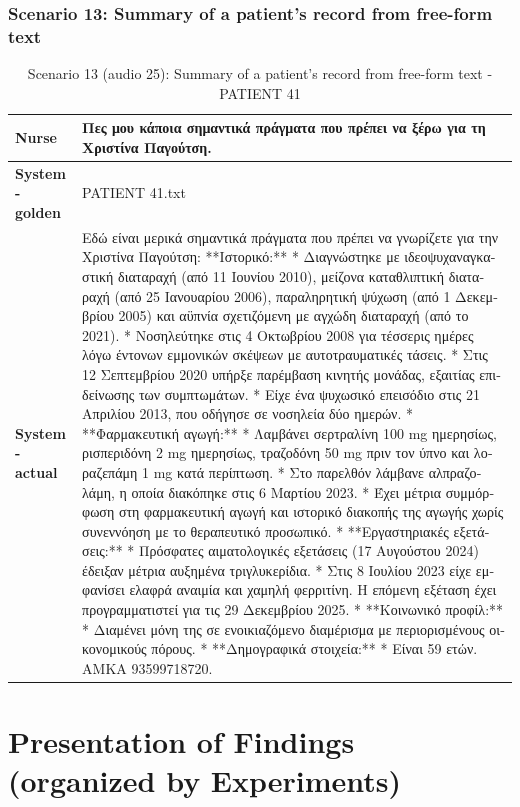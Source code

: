 \subsubsection{Scenario 13: Summary of a patient's record from free-form text}
\begin{table}[H]
\centering
\renewcommand{\arraystretch}{1.5} 
\begin{tabular}{|>{\bfseries}l|p{11cm}|}
\hline
Nurse & \textgreek{Πες μου κάποια σημαντικά πράγματα που πρέπει να ξέρω για τη Χριστίνα Παγούτση.} \\
\hline
System - golden & PATIENT 41.txt \\
\hline
System - actual & \textgreek{Εδώ είναι μερικά σημαντικά πράγματα που πρέπει να γνωρίζετε για την Χριστίνα Παγούτση:
**Ιστορικό:**
*   Διαγνώστηκε με ιδεοψυχαναγκαστική διαταραχή (από 11 Ιουνίου 2010), μείζονα καταθλιπτική διαταραχή (από 25 Ιανουαρίου 2006), παραληρητική ψύχωση (από 1 Δεκεμβρίου 2005) και αϋπνία σχετιζόμενη με αγχώδη διαταραχή (από το 2021).
*   Νοσηλεύτηκε στις 4 Οκτωβρίου 2008 για τέσσερις ημέρες λόγω έντονων εμμονικών σκέψεων με αυτοτραυματικές τάσεις.
*   Στις 12 Σεπτεμβρίου 2020 υπήρξε παρέμβαση κινητής μονάδας, εξαιτίας επιδείνωσης των συμπτωμάτων.
*   Είχε ένα ψυχωσικό επεισόδιο στις 21 Απριλίου 2013, που οδήγησε σε νοσηλεία δύο ημερών.
*   **Φαρμακευτική αγωγή:**
*   Λαμβάνει σερτραλίνη 100 mg ημερησίως, ρισπεριδόνη 2 mg ημερησίως, τραζοδόνη 50 mg πριν τον ύπνο και λοραζεπάμη 1 mg κατά περίπτωση.
*   Στο παρελθόν λάμβανε αλπραζολάμη, η οποία διακόπηκε στις 6 Μαρτίου 2023.
*   Έχει μέτρια συμμόρφωση στη φαρμακευτική αγωγή και ιστορικό διακοπής της αγωγής χωρίς συνεννόηση με το θεραπευτικό προσωπικό.
*   **Εργαστηριακές εξετάσεις:**
*   Πρόσφατες αιματολογικές εξετάσεις (17 Αυγούστου 2024) έδειξαν μέτρια αυξημένα τριγλυκερίδια.
*   Στις 8 Ιουλίου 2023 είχε εμφανίσει ελαφρά αναιμία και χαμηλή φερριτίνη. Η επόμενη εξέταση έχει προγραμματιστεί για τις 29 Δεκεμβρίου 2025.
*   **Κοινωνικό προφίλ:**
*   Διαμένει μόνη της σε ενοικιαζόμενο διαμέρισμα με περιορισμένους οικονομικούς πόρους.
*   **Δημογραφικά στοιχεία:**
*   Είναι 59 ετών. ΑΜΚΑ 93599718720.} \\
\hline
\end{tabular}
\caption{Scenario 13 (audio 25): Summary of a patient's record from free-form text - PATIENT 41}
\end{table}

\section{Presentation of Findings (organized by Experiments)}
